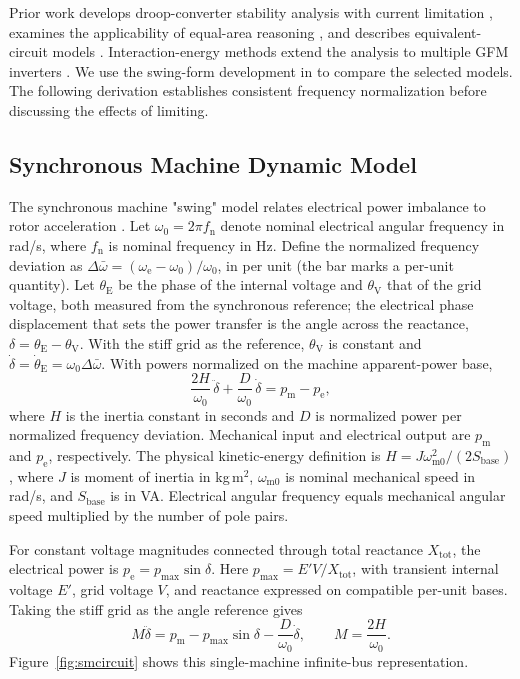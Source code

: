 \documentclass[11pt]{article}
\begin{document}
Prior work develops droop-converter stability analysis with current limitation \cite{huang2019}, examines the applicability of equal-area reasoning \cite{chatterjee2025eac}, and describes equivalent-circuit models \cite{chatterjee2025compel}. Interaction-energy methods extend the analysis to multiple GFM inverters \cite{chatterjee2025ecce}. We use the swing-form development in \cite{chatterjee2026note} to compare the selected models. The following derivation establishes consistent frequency normalization before discussing the effects of limiting.

\subsection{Synchronous Machine Dynamic Model}
\label{sec:smmodel}
The synchronous machine "swing" model relates electrical power imbalance to rotor acceleration \cite{sauer1998,kundur1994}. Let $\omega_0=2\pi f_{\mathrm{n}}$ denote nominal electrical angular frequency in rad/s, where $f_{\mathrm{n}}$ is nominal frequency in Hz. Define the normalized frequency deviation as $\Delta\bar{\omega}=(\omega_{\mathrm{e}}-\omega_0)/\omega_0$, in per unit (the bar marks a per-unit quantity). Let $\theta_{\mathrm{E}}$ be the phase of the internal voltage and $\theta_{\mathrm{V}}$ that of the grid voltage, both measured from the synchronous reference; the electrical phase displacement that sets the power transfer is the angle across the reactance, $\delta=\theta_{\mathrm{E}}-\theta_{\mathrm{V}}$. With the stiff grid as the reference, $\theta_{\mathrm{V}}$ is constant and $\dot\delta=\dot\theta_{\mathrm{E}}=\omega_0\Delta\bar{\omega}$. With powers normalized on the machine apparent-power base,
\begin{equation}
\frac{2H}{\omega_0}\,\ddot\delta+\frac{D}{\omega_0}\,\dot\delta=p_{\mathrm{m}}-p_{\mathrm{e}},
\label{eq:swingangle}
\end{equation}
where $H$ is the inertia constant in seconds and $D$ is normalized power per normalized frequency deviation. Mechanical input and electrical output are $p_{\mathrm{m}}$ and $p_{\mathrm{e}}$, respectively. The physical kinetic-energy definition is $H=J\omega_{\mathrm{m0}}^2/(2S_{\mathrm{base}})$, where $J$ is moment of inertia in kg\,m$^2$, $\omega_{\mathrm{m0}}$ is nominal mechanical speed in rad/s, and $S_{\mathrm{base}}$ is in VA. Electrical angular frequency equals mechanical angular speed multiplied by the number of pole pairs.

For constant voltage magnitudes connected through total reactance $X_{\mathrm{tot}}$, the electrical power is $p_{\mathrm{e}}=p_{\mathrm{max}}\sin\delta$. Here $p_{\mathrm{max}}=E'V/X_{\mathrm{tot}}$, with transient internal voltage $E'$, grid voltage $V$, and reactance expressed on compatible per-unit bases. Taking the stiff grid as the angle reference gives
\begin{equation}
M\ddot\delta=p_{\mathrm{m}}-p_{\mathrm{max}}\sin\delta-\frac{D}{\omega_0}\dot\delta,
\qquad M=\frac{2H}{\omega_0}.
\label{eq:swingeq}
\end{equation}
Figure~\ref{fig:smcircuit} shows this single-machine infinite-bus representation.
\end{document}
